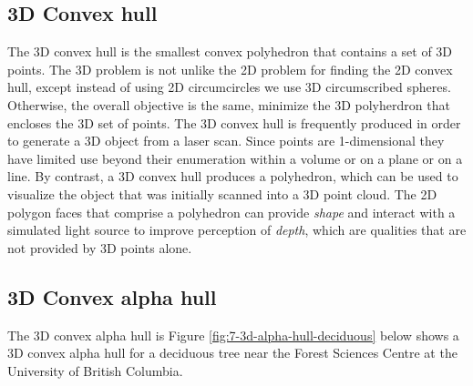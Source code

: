\documentclass[
]{book}
\begin{document}
\hypertarget{d-convex-hull}{%
\subsection{3D Convex hull}\label{d-convex-hull}}

The 3D convex hull is the smallest convex polyhedron that contains a set of 3D points. The 3D problem is not unlike the 2D problem for finding the 2D convex hull, except instead of using 2D circumcircles we use 3D circumscribed spheres. Otherwise, the overall objective is the same, minimize the 3D polyherdron that encloses the 3D set of points. The 3D convex hull is frequently produced in order to generate a 3D object from a laser scan. Since points are 1-dimensional they have limited use beyond their enumeration within a volume or on a plane or on a line. By contrast, a 3D convex hull produces a polyhedron, which can be used to visualize the object that was initially scanned into a 3D point cloud. The 2D polygon faces that comprise a polyhedron can provide \emph{shape} and interact with a simulated light source to improve perception of \emph{depth}, which are qualities that are not provided by 3D points alone.

\hypertarget{d-convex-alpha-hull}{%
\subsection{3D Convex alpha hull}\label{d-convex-alpha-hull}}

The 3D convex alpha hull is Figure \ref{fig:7-3d-alpha-hull-deciduous} below shows a 3D convex alpha hull for a deciduous tree near the Forest Sciences Centre at the University of British Columbia.
\end{document}
